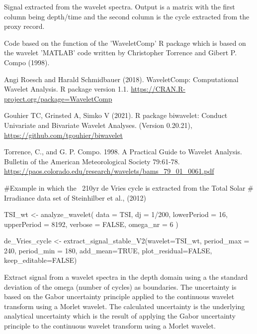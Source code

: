 \documentclass[a4paper]{book}
\begin{document}
%
\begin{Value}
Signal extracted from the wavelet spectra.
Output is a matrix with the first column being depth/time
and the second column is the cycle extracted from the proxy record.
\end{Value}
%
\begin{Author}
Code based on the  function of the 'WaveletComp' R package
which is based on the wavelet 'MATLAB' code written by Christopher Torrence and Gibert P. Compo (1998).
\end{Author}
%
\begin{References}
Angi Roesch and Harald Schmidbauer (2018). WaveletComp: Computational
Wavelet Analysis. R package version 1.1.
\url{https://CRAN.R-project.org/package=WaveletComp}

Gouhier TC, Grinsted A, Simko V (2021). R package biwavelet: Conduct Univariate and Bivariate Wavelet Analyses. (Version 0.20.21),
\url{https://github.com/tgouhier/biwavelet}

Torrence, C., and G. P. Compo. 1998. A Practical Guide to Wavelet Analysis.
Bulletin of the American Meteorological Society 79:61-78.
\url{https://paos.colorado.edu/research/wavelets/bams_79_01_0061.pdf}
\end{References}
%
\begin{Examples}
\begin{ExampleCode}
#Example in which the ~210yr de Vries cycle is extracted from the Total Solar
# Irradiance data set of Steinhilber et al., (2012)

TSI_wt <-
analyze_wavelet(
data = TSI,
dj = 1/200,
lowerPeriod = 16,
upperPeriod = 8192,
   verbose = FALSE,
   omega_nr = 6
 )

de_Vries_cycle <- extract_signal_stable_V2(wavelet=TSI_wt,
period_max = 240,
period_min = 180,
add_mean=TRUE,
plot_residual=FALSE,
keep_editable=FALSE)


\end{ExampleCode}
\end{Examples}
%
\begin{Description}
Extract signal from a
wavelet spectra in the depth domain using a the standard deviation of the omega (number of cycles)
as boundaries. The uncertainty is based on the Gabor uncertainty principle applied to the
continuous wavelet transform using a Morlet wavelet. The calculated uncertainty is the underlying
analytical uncertainty which is the result of applying the Gabor uncertainty principle to the
continuous wavelet transform using a Morlet wavelet.
\end{Description}
\end{document}
